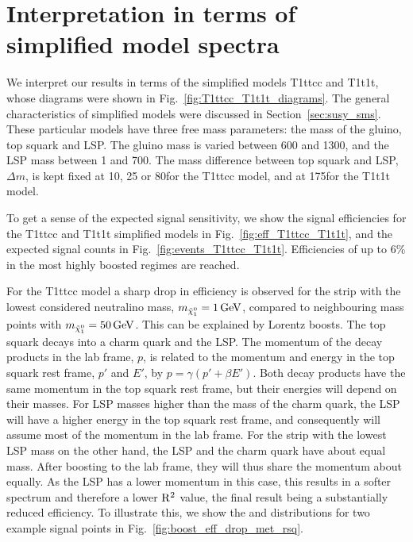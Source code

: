 \section{Interpretation in terms of simplified model spectra \label{sec:boost_interpretation}}

We interpret our results in terms of the simplified models T1ttcc and T1t1t, whose
diagrams were shown in Fig.~\ref{fig:T1ttcc_T1t1t_diagrams}. The general characteristics of
simplified models were discussed in Section~\ref{sec:susy_sms}. These particular models have three
free mass parameters: the mass of the gluino, top squark and LSP. The gluino mass is varied between
600 and 1300\GeV, and the LSP mass between 1 and 700\GeV. The mass difference between top squark and
LSP, $\Delta m$, is kept fixed at 10, 25 or 80\GeV for the T1ttcc model, and at 175\GeV for the
T1t1t model. 

To get a sense of the expected signal sensitivity, we show the signal efficiencies for the T1ttcc
and T1t1t simplified models in Fig.~\ref{fig:eff_T1ttcc_T1t1t}, and the expected signal counts in
Fig.~\ref{fig:events_T1ttcc_T1t1t}. 
Efficiencies of up to 6\% in the most highly boosted regimes are reached. 

For the T1ttcc model a sharp drop in efficiency is observed for the strip with the lowest considered
neutralino mass, $m_{\tilde{\chi}_1^0} = 1\,\text{Ge\hspace{-.08em}V}$, compared to neighbouring mass points with $m_{\tilde{\chi}_1^0} = 50\,\text{Ge\hspace{-.08em}V}$.
This can be explained by Lorentz boosts. The top squark decays into a charm quark and the LSP. The
momentum of the decay products in the lab frame, $p$, is related to the momentum and energy in the
top squark rest frame, $p'$ and $E'$, by $p = \gamma (p' + \beta E')$. Both decay products have the
same momentum in the top squark rest frame, but their energies will depend on their masses. 
For LSP masses higher than the mass of the charm quark, the LSP will have a higher energy
in the top squark rest frame, and consequently will assume most of the momentum in the lab frame.
For the strip with the lowest LSP mass on the other hand, the LSP and the charm quark have
about equal mass. After boosting to the lab frame, they will thus share the momentum about equally.
As the LSP has a lower momentum in this case, this results in a softer \ETm spectrum and therefore a
lower $\mathrm{R^2}$ value, the final result being a substantially reduced efficiency. To illustrate
this, we show the \ETm and \rsq distributions for two example signal points in
Fig.~\ref{fig:boost_eff_drop_met_rsq}.

